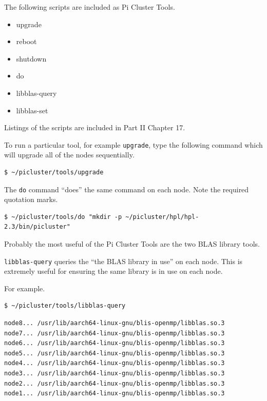 \documentclass{report}
\begin{document}
The following scripts are included as Pi Cluster Tools.

\begin{itemize}
\item upgrade
\item reboot
\item shutdown
\item do
\item libblas-query
\item libblas-set
\end{itemize}

Listings of the scripts are included in Part II Chapter 17.

To run a particular tool, for example \verb|upgrade|, type the following command which will upgrade all of the nodes sequentially.

\lstset{style=type}
\begin{lstlisting}
$ ~/picluster/tools/upgrade
\end{lstlisting}

The \verb|do| command ``does'' the same command on each node. Note the required quotation marks.

\lstset{style=type}
\begin{lstlisting}
$ ~/picluster/tools/do "mkdir -p ~/picluster/hpl/hpl-2.3/bin/picluster"
\end{lstlisting}


Probably the most useful of the Pi Cluster Tools are the two BLAS library tools.

\verb|libblas-query| queries the ``the BLAS library in use'' on each node. This is extremely useful for ensuring the same library is in use on each node.

For example.

\lstset{style=type}
\begin{lstlisting}
$ ~/picluster/tools/libblas-query
\end{lstlisting}

\lstset{style=term}
\begin{lstlisting}
node8... /usr/lib/aarch64-linux-gnu/blis-openmp/libblas.so.3
node7... /usr/lib/aarch64-linux-gnu/blis-openmp/libblas.so.3
node6... /usr/lib/aarch64-linux-gnu/blis-openmp/libblas.so.3
node5... /usr/lib/aarch64-linux-gnu/blis-openmp/libblas.so.3
node4... /usr/lib/aarch64-linux-gnu/blis-openmp/libblas.so.3
node3... /usr/lib/aarch64-linux-gnu/blis-openmp/libblas.so.3
node2... /usr/lib/aarch64-linux-gnu/blis-openmp/libblas.so.3
node1... /usr/lib/aarch64-linux-gnu/blis-openmp/libblas.so.3
\end{lstlisting}
\end{document}

